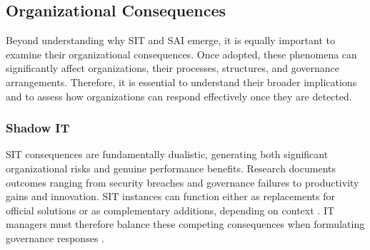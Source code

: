 \documentclass[12pt,oneside]{article}
\begin{document}
\subsection{Organizational Consequences} \label{organizational-consequences}

Beyond understanding why \ac{SIT} and \ac{SAI} emerge, it is equally important to examine their organizational consequences. Once adopted, these phenomena can significantly affect organizations, their processes, structures, and governance arrangements. Therefore, it is essential to understand their broader implications and to assess how organizations can respond effectively once they are detected.

\subsubsection{Shadow IT}

\ac{SIT} consequences are fundamentally dualistic, generating both significant organizational risks and genuine performance benefits. Research documents outcomes ranging from security breaches and governance failures to productivity gains and innovation. \ac{SIT} instances can function either as replacements for official solutions or as complementary additions, depending on context \citep[1025]{rentrop2012shadow}. \ac{IT} managers must therefore balance these competing consequences when formulating governance responses \citep[13]{mallmann2018weare}.
\end{document}
